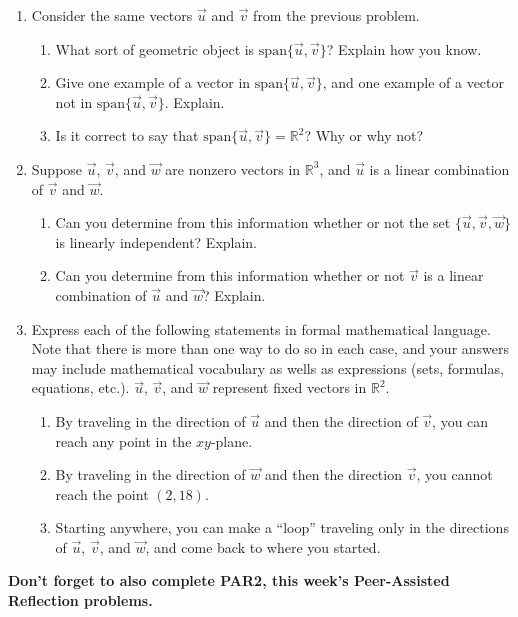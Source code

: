 \documentclass[letter]{article}
\newcommand{\R}{\mathbb{R}}
\newcommand{\Span}{\mathrm{span}}
\begin{document}
\begin{enumerate}
		\item Consider the same vectors $\vec{u}$ and $\vec{v}$ from the previous problem.
		\begin{enumerate}
			\item What sort of geometric object is $\Span \{\vec{u},\vec{v}\} $?  Explain how you know.
			\item Give one example of a vector in $\Span \{\vec{u},\vec{v}\} $, and one example of a vector not in $\Span \{\vec{u},\vec{v}\} $.  Explain.
			\item Is it correct to say that $\Span \{\vec{u},\vec{v}\} = \R^2$?  Why or why not?
		\end{enumerate}
		
		\item Suppose $\vec{u}$, $\vec{v}$, and $\vec{w}$ are nonzero vectors in $\R^3$, and $\vec{u}$ is a linear combination of $\vec{v}$ and $\vec{w}$.
		\begin{enumerate}
			\item Can you determine from this information whether or not the set $\{\vec{u}, \vec{v},\vec{w} \}$ is linearly independent?  Explain.
			\item Can you determine from this information whether or not $\vec{v}$ is a linear combination of $\vec{u}$ and $\vec{w}$?  Explain.
		\end{enumerate}
		
		\item Express each of the following statements in formal mathematical language.  Note that there is more than one way to do so in each case, and your answers may include mathematical vocabulary as wells as expressions (sets, formulas, equations, etc.).  $\vec{u}$, $\vec{v}$, and $\vec{w}$ represent fixed vectors in $\R^2$.
		\begin{enumerate}
			\item By traveling in the direction of $\vec{u}$ and then the direction of $\vec{v}$, you can reach any point in the $xy$-plane.
			\item By traveling in the direction of $\vec{w}$ and then the direction $\vec{v}$, you cannot reach the point $(2,18)$.
			\item Starting anywhere, you can make a ``loop'' traveling only in the directions of $\vec{u}$, $\vec{v}$, and $\vec{w}$, and come back to where you started.
		\end{enumerate}

		
	\end{enumerate}
	
	\textbf{Don't forget to also complete PAR2, this week's Peer-Assisted Reflection problems.}
	
\end{document}
